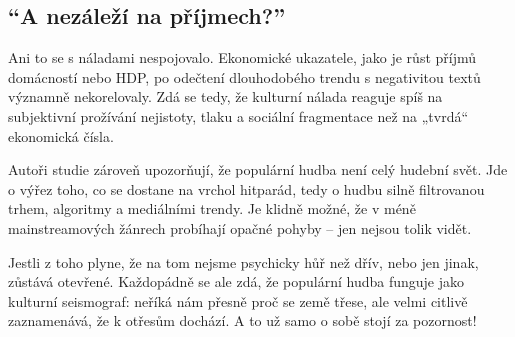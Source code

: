 \documentclass[main.tex]{subfiles}
\begin{document}
\subsection*{\enquote{A nezáleží na příjmech?}}
Ani to se s náladami nespojovalo. Ekonomické ukazatele, jako je růst příjmů domácností nebo HDP, po odečtení dlouhodobého trendu s negativitou textů významně nekorelovaly. Zdá se tedy, že kulturní nálada reaguje spíš na subjektivní prožívání nejistoty, tlaku a sociální fragmentace než na „tvrdá“ ekonomická čísla.\par
Autoři studie zároveň upozorňují, že populární hudba není celý hudební svět. Jde o výřez toho, co se dostane na vrchol hitparád, tedy o hudbu silně filtrovanou trhem, algoritmy a mediálními trendy. Je klidně možné, že v méně mainstreamových žánrech probíhají opačné pohyby – jen nejsou tolik vidět.\par
Jestli z toho plyne, že na tom nejsme psychicky hůř než dřív, nebo jen jinak, zůstává otevřené. Každopádně se ale zdá, že populární hudba funguje jako kulturní seismograf: neříká nám přesně proč se země třese, ale velmi citlivě zaznamenává, že k otřesům dochází. A to už samo o sobě stojí za pozornost!
\newpage
\end{document}
